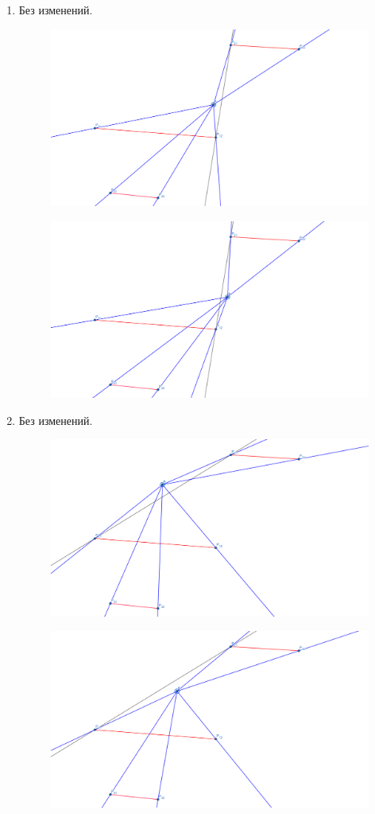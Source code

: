 \documentclass[letterpaper,12pt]{article}
\begin{document}
\begin{enumerate}
\begin{figure}[H]
            \end{figure}
      \item Без изменений.
            \begin{figure}[H]
            \centering
            \includegraphics[width=0.5\linewidth]{between_1_1.png}
            \end{figure}
            \begin{figure}[H]
            \centering
            \includegraphics[width=0.5\linewidth]{between_1_2.png}
            \end{figure}
      \item Без изменений.
            \begin{figure}[H]
            \centering
            \includegraphics[width=0.5\linewidth]{between_2_1.png}
            \end{figure}
            \begin{figure}[H]
            \centering
            \includegraphics[width=0.5\linewidth]{between_2_2.png}
            \end{figure}
\end{enumerate}
\end{document}
